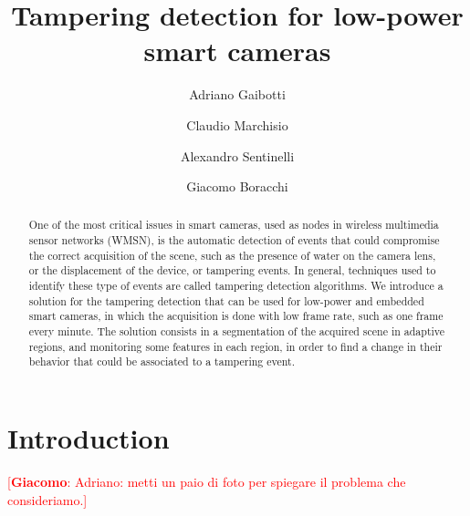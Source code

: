 \documentclass{llncs}
\newcommand{\gi}[1]{{\textcolor{red}{[\small \textbf{Giacomo}: #1]}}}
\begin{document}
\title{Tampering detection for low-power smart cameras}

\author{Adriano Gaibotti \and Claudio Marchisio \and Alexandro Sentinelli \and Giacomo Boracchi}

\maketitle

\begin{abstract}
One of the most critical issues in smart cameras, used as nodes in wireless multimedia sensor networks (WMSN), is the automatic detection of events that could compromise the correct acquisition of the scene, such as the presence of water on the camera lens, or the displacement of the device, or tampering events. 
In general, techniques used to identify these type of events are called tampering detection algorithms.
We introduce a solution for the tampering detection that can be used for low-power and embedded smart cameras, in which the acquisition is done with low frame rate, such as one frame every minute.
The solution consists in a segmentation of the acquired scene in adaptive regions, and monitoring some features in each region, in order to find a change in their behavior that could be associated to a tampering event.

\end{abstract}

\section{Introduction}\label{sec:introduction}

\gi{Adriano: metti un paio di foto per spiegare il problema che consideriamo.}
\end{document}
